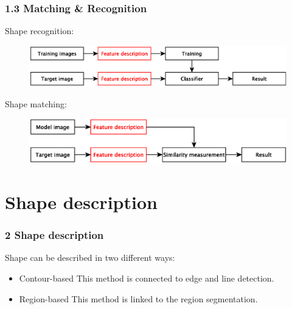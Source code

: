 \documentclass[notheorems,serif,table,compress]{beamer}  %
\begin{document}
\begin{frame}
\frametitle{1.3 Matching \& Recognition}
    Shape recognition:
    \begin{tcolorbox}[colback=red!5,colframe=blue!75!black]
        \begin{figure}
            \includegraphics[width=1\linewidth]{recogChart1} 
        \end{figure}
    \end{tcolorbox}
    Shape matching:
    \begin{tcolorbox}[colback=red!5,colframe=blue!75!black]
        \begin{figure}
            \includegraphics[width=1\linewidth]{matchChart1} 
        \end{figure}
    \end{tcolorbox}
\end{frame}



\section{Shape description}


\begin{frame}
\frametitle{2 Shape description}
Shape can be described in two different ways:\newline

    \begin{itemize}
        \item Contour-based\newline
        This method is connected to edge and line detection.
        \item Region-based\newline
        This method is linked to the region segmentation.
    \end{itemize}
\end{frame}
\end{document}
